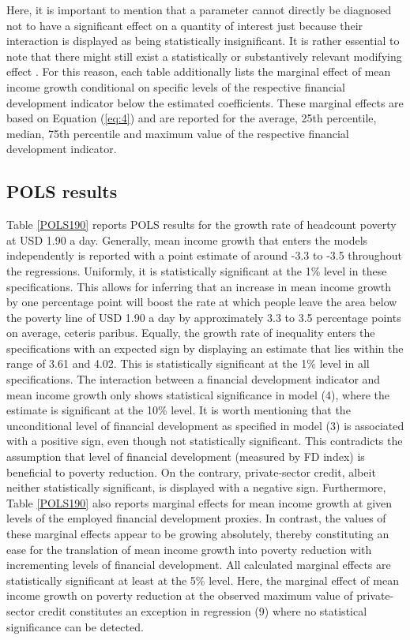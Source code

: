 \documentclass[12pt, a4paper]{article}
\begin{document}
Here, it is important to mention that a parameter cannot directly be diagnosed not to have a significant effect on a quantity of interest just because their interaction is displayed as being statistically insignificant. It is rather essential to note that there might still exist a statistically or substantively relevant modifying effect \cite{golder2006, brambor2007}. For this reason, each table additionally lists the marginal effect of mean income growth conditional on specific levels of the respective financial development indicator below the estimated coefficients. These marginal effects are based on Equation (\ref{eq:4}) and are reported for the average, 25th percentile, median, 75th percentile and  maximum value of the respective financial development indicator.

\subsection{POLS results}

Table \ref{POLS190} reports POLS results for the growth rate of headcount poverty at USD 1.90 a day. Generally, mean income growth that enters the models independently is reported with a point estimate of around -3.3 to -3.5 throughout the regressions. Uniformly, it is statistically significant at the 1\% level in these specifications. This allows for inferring that an increase in mean income growth by one percentage point will boost the rate at which people leave the area below the poverty line of USD 1.90 a day by approximately 3.3 to 3.5 percentage points on average, ceteris paribus. Equally, the growth rate of inequality enters the specifications with an expected sign by displaying an estimate that lies within the range of 3.61 and 4.02. This is statistically significant at the 1\% level in all specifications. The interaction between a financial development indicator and mean income growth only shows statistical significance in model (4), where the estimate is significant at the 10\% level. It is worth mentioning that the unconditional level of financial development as specified in model (3) is associated with a positive sign, even though not statistically significant. This contradicts the assumption that level of financial development (measured by FD index) is beneficial to poverty reduction. On the contrary, private-sector credit, albeit neither statistically significant, is displayed with a negative sign. Furthermore, Table \ref{POLS190} also reports marginal effects for mean income growth at given levels of the employed financial development proxies. In contrast, the values of these marginal effects appear to be growing absolutely, thereby constituting an ease for the translation of mean income growth into poverty reduction with incrementing levels of financial development. All calculated marginal effects are statistically significant at least at the 5\% level. Here, the marginal effect of mean income growth on poverty reduction at the observed maximum value of private-sector credit constitutes an exception in regression (9) where no statistical significance can be detected.
\end{document}
